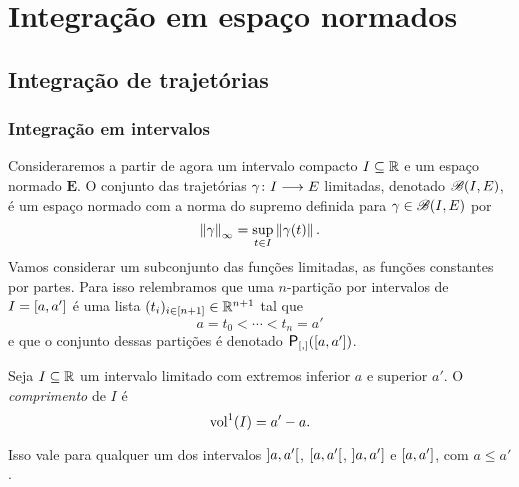 
























\section{Integração em espaço normados}

\subsection{Integração de trajetórias}

\subsubsection{Integração em intervalos}

Consideraremos a partir de agora um intervalo compacto $I \subseteq \mathbb{R}$ e um espaço normado $\bm E$. O conjunto das trajetórias $\gamma\colon \allowbreak I \longrightarrow E$ limitadas, denotado $\mathscr{B}(I,E)$, é um espaço normado com a norma do supremo definida para $\gamma \in \mathscr{B}(I,E)$ por
	\begin{equation*}
	\left\Vert{\gamma}\right\Vert_{\infty} = \sup_{t \in I} \left\Vert{\gamma(t)}\right\Vert.
	\end{equation*}
Vamos considerar um subconjunto das funções limitadas, as funções constantes por partes. Para isso relembramos que uma $n$-partição por intervalos de $I = \left[a,\allowbreak a'\right]$ é uma lista $(t_i)_{i \in [n+1]} \in \mathbb{R}^{n+1}$ tal que
	\begin{equation*}
	a = t_0 < \cdots < t_n = a'
	\end{equation*}
e que o conjunto dessas partições é denotado $\Partinter(\intff{a}{a'})$.

\begin{definition}
Seja $I \subseteq \mathbb{R}$ um intervalo limitado com extremos inferior $a$ e superior $a'$. O \emph{comprimento} de $I$ é
	\begin{equation*}
	\operatorname{vol}^1(I) = a'-a.
	\end{equation*}
\end{definition}

Isso vale para qualquer um dos intervalos $\left]a,\allowbreak a'\right[$, $\left[a,\allowbreak a'\right[$, $\left]a,\allowbreak a'\right]$ e $\left[a,\allowbreak a'\right]$, com $a \leq a'$.

